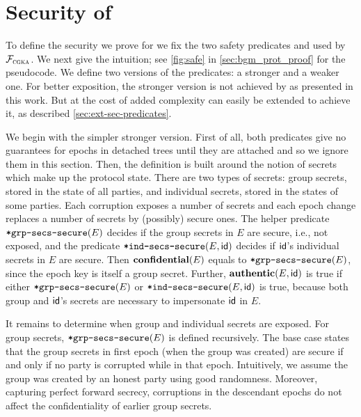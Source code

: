 
\section{Security of \saik}\label{sec:saik-sec-int}
To define the security we prove for \saik we fix the two safety
predicates \KwConf{} and \KwAuth{} used by $\mathcal{F}_{\normalfont\textsc{cgka}}$. We next give the intuition; see \cref{fig:safe} in \cref{sec:bgm_prot_proof} for the pseudocode. We define two versions of the
predicates: a stronger and a weaker one. For better exposition, the
stronger version is not achieved by \saik as presented in this work. But at the cost of added complexity
\saik can easily be extended to achieve it, as
described \cref{sec:ext-sec-predicates}.

We begin with the simpler stronger version. First of all, both predicates give no
guarantees for epochs in detached trees until they are attached and so we
ignore them in this section. Then, the definition is built around the notion of
secrets which make up the protocol state. There are two types of secrets:
group secrets, stored in the state of all parties, and individual secrets,
stored in the states of some parties. Each corruption exposes a number of
secrets and each epoch change replaces a number of secrets by (possibly)
secure ones. The helper predicate ${\textnormal{\tt*grp-secs-secure}}{}(E)$ decides
if the group secrets in $E$ are secure, i.e., not exposed, and the
predicate ${\textnormal{\tt*ind-secs-secure}}(E, {\mathsf{id}})$ decides if ${\mathsf{id}}$'s individual
secrets in $E$ are secure.
%
Then $\textnormal{\textbf{confidential}}{}(E)$ equals to
${\textnormal{\tt*grp-secs-secure}}{}(E)$, since the epoch key is itself a group
secret. Further, $\textnormal{\textbf{authentic}}{}(E, {\mathsf{id}})$ is true if either
${\textnormal{\tt*grp-secs-secure}}{}(E)$ or
${\textnormal{\tt*ind-secs-secure}}(E,{\mathsf{id}})$ is true, because both group and ${\mathsf{id}}$'s secrets
are necessary to impersonate ${\mathsf{id}}$ in $E$.

It remains to determine when group and individual secrets are exposed. For
group secrets, ${\textnormal{\tt*grp-secs-secure}}(E)$ is defined recursively. The
base case states that the group secrets in first epoch (when the group was
created) are secure if and only if no party is corrupted while in that epoch.
Intuitively, we assume the group was created by an honest party using good
randomness. Moreover, capturing perfect forward secrecy, corruptions in the
descendant epochs do not affect the confidentiality of earlier group secrets.

